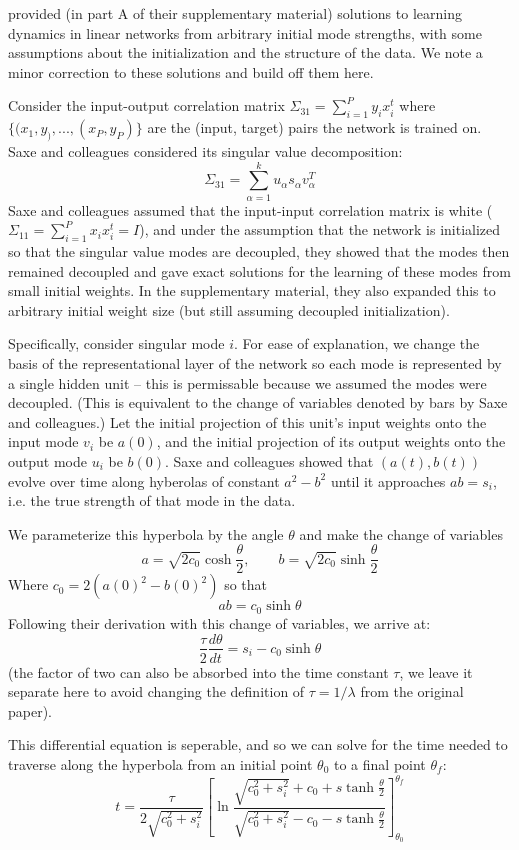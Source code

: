 \documentclass{article}
\begin{document}
\citet{Saxe2014} provided (in part A of their supplementary material) solutions to learning dynamics in linear networks from arbitrary initial mode strengths, with some assumptions about the initialization and the structure of the data. We note a minor correction to these solutions and build off them here. \par
Consider the input-output correlation matrix $\Sigma_{31} = \sum_{i=1}^P y_ix_i^t$ where $\{(x_1, y_), ..., (x_P, y_P)\}$ are the (input, target) pairs the network is trained on. Saxe and colleagues considered its singular value decomposition:
$$\Sigma_{31} = \sum_{\alpha=1}^{k} u_\alpha s_\alpha v_\alpha^T$$
Saxe and colleagues assumed that the input-input correlation matrix is white ($\Sigma_11 = \sum_{i=1}^P x_i x_i^t = I$), and under the assumption that the network is initialized so that the singular value modes are decoupled, they showed that the modes then remained decoupled and gave exact solutions for the learning of these modes from small initial weights. In the supplementary material, they also expanded this to arbitrary initial weight size (but still assuming decoupled initialization). \par
Specifically, consider singular mode $i$. For ease of explanation, we change the basis of the representational layer of the network so each mode is represented by a single hidden unit -- this is permissable because we assumed the modes were decoupled. (This is equivalent to the change of variables denoted by bars by Saxe and colleagues.) Let the initial projection of this unit's input weights onto the input mode $v_i$ be $a(0)$, and the initial projection of its output weights onto the output mode $u_i$ be $b(0)$. Saxe and colleagues showed that $(a(t), b(t))$ evolve over time along hyberolas of constant $a^2-b^2$ until it approaches $ab = s_i$, i.e. the true strength of that mode in the data. \par
We parameterize this hyperbola by the angle $\theta$ and make the change of variables
$$a = \sqrt{2c_0} \cosh \frac{\theta}{2}, \qquad b = \sqrt{2c_0} \sinh \frac{\theta}{2}$$
Where $c_0 = 2 (a(0)^2-b(0)^2)$ so that
$$ab = c_0 \sinh \theta$$
Following their derivation with this change of variables, we arrive at:
$$\frac{\tau}{2} \frac{d\theta}{dt} = s_i - c_0 \sinh \theta$$
(the factor of two can also be absorbed into the time constant $\tau$, we leave it separate here to avoid changing the definition of $\tau = 1/\lambda$ from the original paper). \par
This differential equation is seperable, and so we can solve for the time needed to traverse along the hyperbola from an initial point $\theta_0$ to a final point $\theta_f$:
$$t = \frac{\tau}{2\sqrt{c_0^2 + s_i^2}} \left[\ln \frac{\sqrt{c_0^2 + s_i^2} + c_0 + s \tanh \frac{\theta}{2}}{\sqrt{c_0^2 + s_i^2} - c_0 - s \tanh \frac{\theta}{2}}\right]_{\theta_0}^{\theta_f}$$
\end{document}
